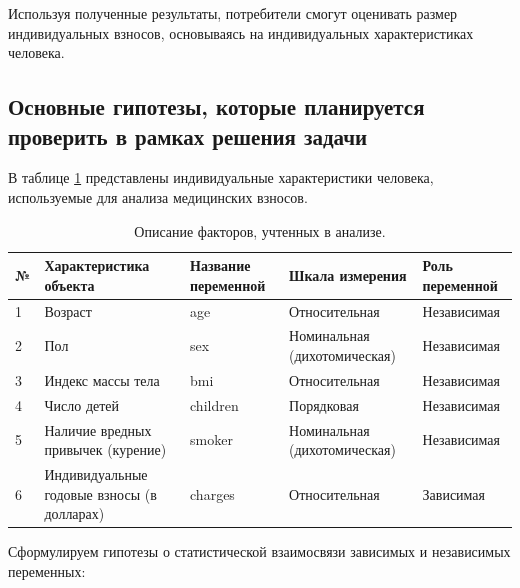 \documentclass[a4paper,12pt]{article}
\begin{document}
Используя полученные результаты, потребители смогут оценивать размер индивидуальных взносов, основываясь на индивидуальных характеристиках человека.

\subsection{Основные гипотезы, которые планируется проверить в рамках решения задачи}
В таблице \ref{tab:table1} представлены индивидуальные характеристики человека, используемые для анализа медицинских взносов. 

\begin{table}[H]
\begin{center}
	\begin{tabular}{ | l | p{4cm} | p{2.6cm} | p{4.2cm} | p{3.7cm} |}
		\hline
		№ & Характеристика объекта & Название переменной & Шкала измерения & Роль переменной \\ \hline
		1 & Возраст & age & Относительная & Независимая \\ \hline
		2 & Пол & sex & Номинальная (дихотомическая) & Независимая \\ \hline
		3 & Индекс массы тела & bmi & Относительная & Независимая \\ \hline
		4 & Число детей & children & Порядковая & Независимая \\ \hline
		5 & Наличие вредных привычек (курение) & smoker & Номинальная (дихотомическая) & Независимая \\ \hline
		6 & Индивидуальные годовые взносы (в долларах) & charges & Относительная & Зависимая \\ \hline
	\end{tabular}
\end{center}
\caption{Описание факторов, учтенных в анализе.}
\label{tab:table1}
\end{table}
Сформулируем гипотезы о статистической взаимосвязи зависимых и независимых переменных:
\end{document}
